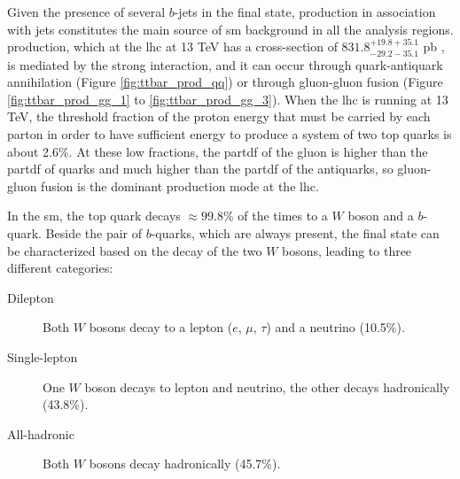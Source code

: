 Given the presence of several $b$-jets in the final state, \ttbar production in association with jets constitutes the main source of \gls{sm} background in all the analysis regions. \ttbar production, which at the \gls{lhc} at 13 TeV has a cross-section of $831.8^{+19.8 + 35.1}_{-29.2-35.1}$ pb \cite{Czakon:2013goa}, is mediated by the strong interaction, and it can occur through quark-antiquark annihilation (Figure \ref{fig:ttbar_prod_qq}) or through gluon-gluon fusion (Figure \ref{fig:ttbar_prod_gg_1} to \ref{fig:ttbar_prod_gg_3}). When the \gls{lhc} is running at 13 TeV, the threshold fraction of the proton energy that must be carried by each parton in order to have sufficient energy to produce a system of two top quarks 
is about 2.6\%.
At these low fractions, the \gls{partdf} of the gluon is higher than the \gls{partdf} of quarks and much higher than the \gls{partdf} of the antiquarks, so gluon-gluon fusion is the dominant \ttbar production mode at the \gls{lhc}.


In the \gls{sm}, the top quark decays $\approx 99.8$\% of the times to a $W$ boson and a $b$-quark. 
Beside the pair of $b$-quarks, which are always present, the final state can be characterized based on the decay of the two $W$ bosons, leading to three different categories:
\begin{description}
\item[Dilepton]  Both $W$ bosons decay to a lepton ($e$, $\mu$, $\tau$) and a neutrino (10.5\%).
\item[Single-lepton] One $W$ boson decays to lepton and neutrino, the other decays hadronically (43.8\%).
\item[All-hadronic] Both $W$ bosons decay hadronically (45.7\%).
\end{description}

